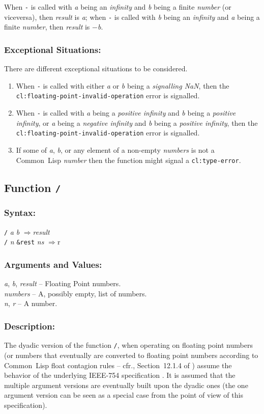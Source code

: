 \documentclass[10pt,fleqn]{article}
\newcommand{\CL}{\textsf{Common~Lisp}}
\newcommand{\code}[1]{\texttt{#1}}
\newcommand{\clieeeterm}[1]{\textit{#1}}
\newcommand{\varname}[1]{\textit{#1}}
\newcommand{\clterm}[1]{\textit{#1}}
\newcommand{\clname}[1]{\texttt{#1}}
\newcommand{\RArrow}{$\Rightarrow$}
\newcommand{\IEEEFPStd}{IEEE-754}
\newcommand{\DDictionaryItem}[1]{\vspace*{6pt}\noindent\hrulefill\vspace*{-9pt}\subsection*{#1}}
\newcommand{\DSyntax}{\subsubsection*{Syntax:}}
\newcommand{\DArgsNValues}{\subsubsection*{Arguments and Values:}}
\newcommand{\DDescription}{\subsubsection*{Description:}}
\newcommand{\DExceptional}{\subsubsection*{Exceptional Situations:}}
\begin{document}
When \code{-} is called with \varname{a} being an 
\clieeeterm{infinity} and \varname{b} being a finite \clterm{number}
(or viceversa), then \varname{result} is \varname{a}; when \code{-} is
called with \varname{b} being an \clieeeterm{infinity} and \varname{a}
being a finite \clterm{number}, then \varname{result}
is $-$\varname{b}.


\DExceptional{}

There are different exceptional situations to be considered.

\begin{enumerate}
\item When \code{-} is called with either \varname{a} or \varname{b}
  being a \emph{signalling NaN}, then the\\
  \clname{cl:floating-point-invalid-operation} error is signalled.

\item When \code{-} is called with \varname{a} being a
  \clieeeterm{positive infinity} and \varname{b} being a
  \clieeeterm{positive infinity}, or \varname{a} being a
  \clieeeterm{negative infinity} and \varname{b} being a
  \clieeeterm{positive infinity}, then the\\
  \clname{cl:floating-point-invalid-operation} error is signalled.

\item If some of \varname{a}, \varname{b}, or any element of a non-empty
  \varname{numbers} is not a \CL{} \clterm{number} then the function
  might signal a \clname{cl:type-error}.
\end{enumerate}


\DDictionaryItem{Function \code{/}}

\DSyntax{}

\code{/} \varname{a} \varname{b} \RArrow \varname{result}\\
\code{/} \varname{n} \code{\&rest} \varname{ns} \RArrow \varname \code{r}\\

\DArgsNValues{}

\varname{a}, \varname{b}, \varname{result} -- Floating Point numbers.\\
\varname{numbers} -- A, possibly empty, list of numbers.\\
\varname{n}, \varname{r} -- A number.



\DDescription{}

The dyadic version of the function \code{/}, when operating on
floating point numbers (or numbers that eventually are converted to
floating point numbers according to \CL{} float contagion rules -- cfr.,
Section~12.1.4 of \cite{1996:ANSIHyperSpec}) assume the behavior of the
underlying \IEEEFPStd{} specification \cite{2008:IEEE-754}.  It is assumed that
the multiple argument versions are eventually built upon the dyadic
ones (the one argument version can be seen as a special case from
the point of view of this specification).
\end{document}
